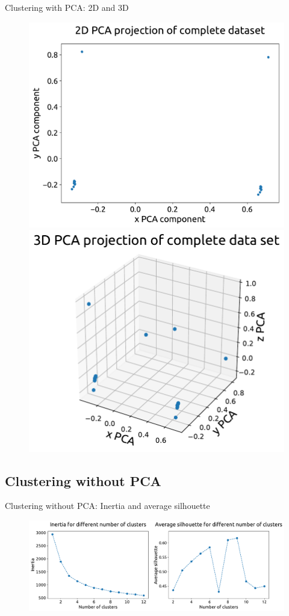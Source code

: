 \documentclass[t,11pt,compress,xcolor=table,hyperref={bookmarks=false}]{beamer}
\begin{document}
\begin{frame}{Clustering with PCA: 2D and 3D}
\begin{figure}
\hspace*{-0.9cm}\includegraphics[width=0.54 \textwidth]{figs/PCA_2D_data.pdf}
\includegraphics[width=0.45 \textwidth]{figs/PCA_3D_data.pdf}
\end{figure}
 \end{frame}


\subsection{Clustering without PCA}


\begin{frame}{Clustering without PCA: Inertia and average silhouette}
\begin{figure}
\hspace*{-0.9cm}\includegraphics[scale=0.35]{figs/NO_PCA_parfigs_1.pdf}
\end{figure}
 \end{frame}
\end{document}
